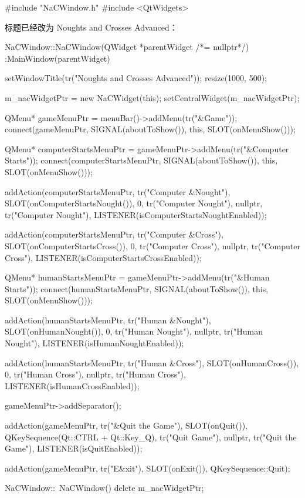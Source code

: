 \medskip{}

\begin{codebox}
#include "NaCWindow.h"
#include <QtWidgets>
\end{codebox}

标题已经改为 Noughts and Crosses Advanced：

\begin{codebox}
NaCWindow::NaCWindow(QWidget *parentWidget /*= nullptr*/)
 :MainWindow(parentWidget) {
  setWindowTitle(tr("Noughts and Crosses Advanced"));
  resize(1000, 500);

  m_nacWidgetPtr = new NaCWidget(this);
  setCentralWidget(m_nacWidgetPtr);

  { QMenu* gameMenuPtr = menuBar()->addMenu(tr("&Game"));
    connect(gameMenuPtr, SIGNAL(aboutToShow()),
            this, SLOT(onMenuShow()));

    { QMenu* computerStartsMenuPtr =
        gameMenuPtr->addMenu(tr("&Computer Starts"));
      connect(computerStartsMenuPtr, SIGNAL(aboutToShow()),
              this, SLOT(onMenuShow()));

      addAction(computerStartsMenuPtr, tr("Computer &Nought"),
                SLOT(onComputerStartsNought()), 0,
                tr("Computer Nought"), nullptr,
                tr("Computer Nought"),
                LISTENER(isComputerStartsNoughtEnabled));

        addAction(computerStartsMenuPtr, tr("Computer &Cross"),
                  SLOT(onComputerStartsCross()), 0,
                  tr("Computer Cross"), nullptr,
                  tr("Computer Cross"),
                  LISTENER(isComputerStartsCrossEnabled));
    }

    { QMenu* humanStartsMenuPtr =
        gameMenuPtr->addMenu(tr("&Human Starts"));
      connect(humanStartsMenuPtr, SIGNAL(aboutToShow()),
              this, SLOT(onMenuShow()));

      addAction(humanStartsMenuPtr, tr("Human &Nought"),
                SLOT(onHumanNought()), 0, tr("Human Nought"),
                nullptr, tr("Human Nought"),
                LISTENER(isHumanNoughtEnabled));

      addAction(humanStartsMenuPtr, tr("Human &Cross"),
                SLOT(onHumanCross()), 0, tr("Human Cross"),
                nullptr, tr("Human Cross"),
                LISTENER(isHumanCrossEnabled));
    }

    gameMenuPtr->addSeparator();

    addAction(gameMenuPtr, tr("&Quit the Game"),
              SLOT(onQuit()),
              QKeySequence(Qt::CTRL + Qt::Key_Q), tr("Quit Game"),
              nullptr, tr("Quit the Game"),
              LISTENER(isQuitEnabled));

    addAction(gameMenuPtr, tr("E&xit"),
              SLOT(onExit()), QKeySequence::Quit);
  }
}

NaCWindow::~NaCWindow() {
  delete m_nacWidgetPtr;
}
\end{codebox}

